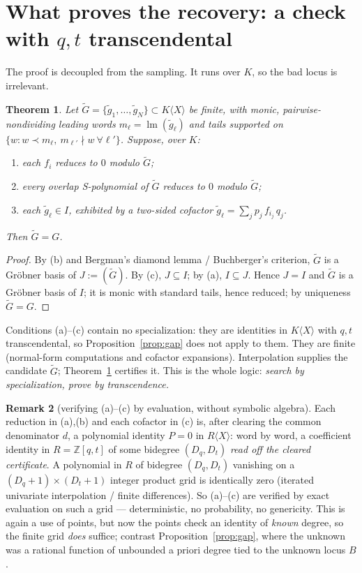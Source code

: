 \documentclass[11pt]{article}
\newtheorem{theorem}{Theorem}
\theoremstyle{definition}
\newtheorem{remark}[theorem]{Remark}
\newcommand{\lm}{\operatorname{lm}}
\begin{document}
\section{What proves the recovery: a check with $q,t$ transcendental}

The proof is decoupled from the sampling. It runs over $K$, so the bad locus is irrelevant.

\begin{theorem}\label{thm:certify}
Let $\widetilde G=\{\tilde g_1,\dots,\tilde g_N\}\subset K\langle X\rangle$ be finite, with monic,
pairwise-nondividing leading words $m_\ell=\lm(\tilde g_\ell)$ and tails supported on
$\{w:w\prec m_\ell,\ m_{\ell'}\nmid w\ \forall\ell'\}$. Suppose, over $K$:
\begin{enumerate}
\item[\textup{(a)}] each $f_i$ reduces to $0$ modulo $\widetilde G$;
\item[\textup{(b)}] every overlap S-polynomial of $\widetilde G$ reduces to $0$ modulo $\widetilde G$;
\item[\textup{(c)}] each $\tilde g_\ell\in I$, exhibited by a two-sided cofactor
      $\tilde g_\ell=\sum_j p_j\,f_{i_j}\,q_j$.
\end{enumerate}
Then $\widetilde G=G$.
\end{theorem}

\begin{proof}
By (b) and Bergman's diamond lemma / Buchberger's criterion, $\widetilde G$ is a Gr\"obner basis of
$J:=(\widetilde G)$. By (c), $J\subseteq I$; by (a), $I\subseteq J$. Hence $J=I$ and $\widetilde G$
is a Gr\"obner basis of $I$; it is monic with standard tails, hence reduced; by uniqueness
$\widetilde G=G$.
\end{proof}

Conditions (a)--(c) contain no specialization: they are identities in $K\langle X\rangle$ with $q,t$
transcendental, so Proposition~\ref{prop:gap} does not apply to them. They are finite (normal-form
computations and cofactor expansions). Interpolation supplies the candidate $\widetilde G$;
Theorem~\ref{thm:certify} certifies it. This is the whole logic: \emph{search by specialization,
prove by transcendence.}

\begin{remark}[verifying (a)--(c) by evaluation, without symbolic algebra]\label{rem:pit}
Each reduction in (a),(b) and each cofactor in (c) is, after clearing the common denominator
$d$, a polynomial identity $P=0$ in $R\langle X\rangle$: word by word, a coefficient identity in
$R=\mathbb{Z}[q,t]$ of some bidegree $(D_q,D_t)$ \emph{read off the cleared certificate}. A
polynomial in $R$ of bidegree $(D_q,D_t)$ vanishing on a $(D_q{+}1)\times(D_t{+}1)$ integer product
grid is identically zero (iterated univariate interpolation / finite differences). So (a)--(c) are
verified by exact evaluation on such a grid --- deterministic, no probability, no genericity. This
is again a use of points, but now the points check an identity of \emph{known} degree, so the finite
grid \emph{does} suffice; contrast Proposition~\ref{prop:gap}, where the unknown was a rational
function of unbounded a priori degree tied to the unknown locus $B$.
\end{remark}
\end{document}
